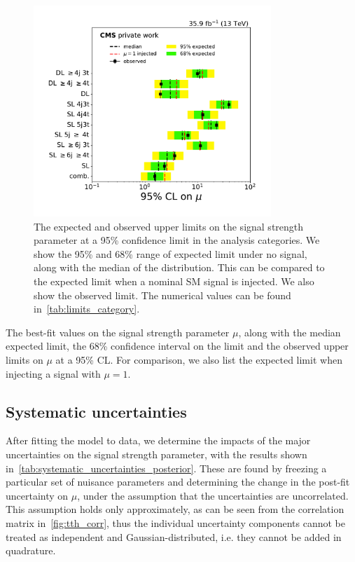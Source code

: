 \begin{figure}
\begin{centering}
\includegraphics[width = 0.8\textwidth]{figures/tth/limits.pdf}
\caption[The expected and observed upper limits on the signal strength parameter.]{The expected and observed upper limits on the signal strength parameter at a 95\% confidence limit in the analysis categories. We show the 95\% and 68\% range of expected limit under no signal, along with the median of the distribution. This can be compared to the expected limit when a nominal SM signal is injected. We also show the observed limit. The numerical values can be found in~\cref{tab:limits_category}.}
\label{fig:tth_limits_category}
\end{centering}
\end{figure}


\begin{table}
\def\arraystretch{1.5}
\begin{center}

\caption[The best-fit values and upper limits per category]{The best-fit values on the signal strength parameter $\mu$, along with the median expected limit, the 68\% confidence interval on the limit and the observed upper limits on $\mu$ at a 95\% CL. For comparison, we also list the expected limit when injecting a signal with $\mu=1$.}
\label{tab:limits_category}
\end{center}
\end{table}

\subsection{Systematic uncertainties}
After fitting the model to data, we determine the impacts of the major uncertainties on the signal strength parameter, with the results shown in~\cref{tab:systematic_uncertainties_posterior}. These are found by freezing a particular set of nuisance parameters and determining the change in the post-fit uncertainty on $\mu$, under the assumption that the uncertainties are uncorrelated. This assumption holds only approximately, as can be seen from the correlation matrix in~\cref{fig:tth_corr}, thus the individual uncertainty components cannot be treated as independent and Gaussian-distributed, i.e. they cannot be added in quadrature.

